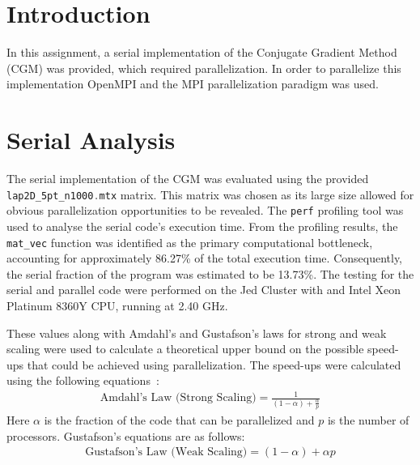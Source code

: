 \section{Introduction}
In this assignment, a serial implementation of the Conjugate Gradient Method (CGM) was provided, which required
parallelization. In order to parallelize this implementation OpenMPI and the MPI parallelization paradigm was used.

\section{Serial Analysis}
The serial implementation of the CGM was evaluated using the provided \lstinline[language=C]|lap2D_5pt_n1000.mtx| matrix. This matrix
was chosen as its large size allowed for obvious parallelization opportunities to be revealed. The \lstinline[language=C]|perf|
profiling tool was used to analyse the serial code's execution time. From the profiling results, the \lstinline[language=C]|mat_vec|
function was identified as the primary computational bottleneck, accounting for approximately 86.27\% of the total execution
time. Consequently, the serial fraction of the program was estimated to be 13.73\%. The testing for the serial and
parallel code were performed on the Jed Cluster with and Intel Xeon Platinum 8360Y CPU, running at  2.40 GHz.


These values along with Amdahl's and Gustafson's laws for strong and weak scaling were used to calculate a theoretical
upper bound on the possible speed-ups that could be achieved using parallelization. The speed-ups were calculated using
the following equations~\cite{AmdahlGustafson2023}: 
\begin{align*}
   \text{Amdahl's Law (Strong Scaling)} = \frac{1}{(1-\alpha) + \frac{\alpha}{p}} 
\end{align*}
Here $\alpha$ is the fraction of the code that can be parallelized and $p$ is the number of processors. Gustafson's
equations are as follows:
\begin{align*}
    \text{Gustafson's Law (Weak Scaling)} = (1-\alpha) + \alpha p 
\end{align*}


